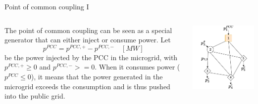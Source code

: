 \begin{frame}{Point of common coupling I}
\begin{columns}
    The point of common coupling can be seen as a special generator that can either inject or consume power.
     Let 
    $$p^{PCC} = p^{PCC,+} - p^{PCC,-} \quad [MW] $$
    be the power injected by the PCC in the microgrid, with $p^{PCC,+} \geq 0$ and $p^{PCC,-} >= 0$.
    When it consumes power ($p^{PCC}\leq 0$), it means that the power generated in the microgrid exceeds the consumption and is thus pushed into the public grid.

\includegraphics[width=\textwidth]{images/netwok_flow-Page-2_drawio.pdf}
\end{columns}
\end{frame}

